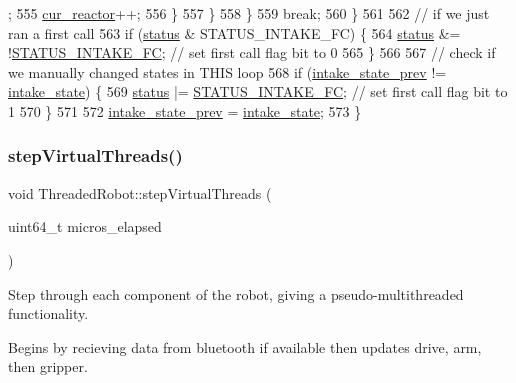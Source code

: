 \begin{DoxyCode}
      ;
555                         \hyperlink{class_threaded_robot_a3c2f2358f32ba58846b13e95b3c55527}{cur\_reactor}++;
556                     \}
557                 \}
558             \}
559             \textcolor{keywordflow}{break};
560     \}
561 
562     \textcolor{comment}{// if we just ran a first call}
563     \textcolor{keywordflow}{if} (\hyperlink{class_threaded_robot_a10f3a9d1b27ca8e7a1ada75323c75879}{status} & STATUS\_INTAKE\_FC) \{
564         \hyperlink{class_threaded_robot_a10f3a9d1b27ca8e7a1ada75323c75879}{status} &= !\hyperlink{_threaded_robot_8hpp_a11f08cf179cbed14133b5202e4b3d08d}{STATUS\_INTAKE\_FC}; \textcolor{comment}{// set first call flag bit to 0}
565     \}
566 
567     \textcolor{comment}{// check if we manually changed states in THIS loop}
568     \textcolor{keywordflow}{if} (\hyperlink{class_threaded_robot_a6ee4298a994be3756ea1821125ab9d57}{intake\_state\_prev} != \hyperlink{class_threaded_robot_a832f25be64f45ff3297d3da9609a9391}{intake\_state}) \{
569         \hyperlink{class_threaded_robot_a10f3a9d1b27ca8e7a1ada75323c75879}{status} |= \hyperlink{_threaded_robot_8hpp_a11f08cf179cbed14133b5202e4b3d08d}{STATUS\_INTAKE\_FC}; \textcolor{comment}{// set first call flag bit to 1}
570     \}
571 
572     \hyperlink{class_threaded_robot_a6ee4298a994be3756ea1821125ab9d57}{intake\_state\_prev} = \hyperlink{class_threaded_robot_a832f25be64f45ff3297d3da9609a9391}{intake\_state};
573 \}
\end{DoxyCode}
\mbox{\label{class_threaded_robot_ae5545fb683a84aec9bda34a2c9bba228}} 
\subsubsection{\texorpdfstring{step\+Virtual\+Threads()}{stepVirtualThreads()}}
{\footnotesize\ttfamily void Threaded\+Robot\+::step\+Virtual\+Threads (\begin{DoxyParamCaption}\item[{uint64\+\_\+t}]{micros\+\_\+elapsed }\end{DoxyParamCaption})}



Step through each component of the robot, giving a pseudo-\/multithreaded functionality. 

Begins by recieving data from bluetooth if available then updates drive, arm, then gripper. 

